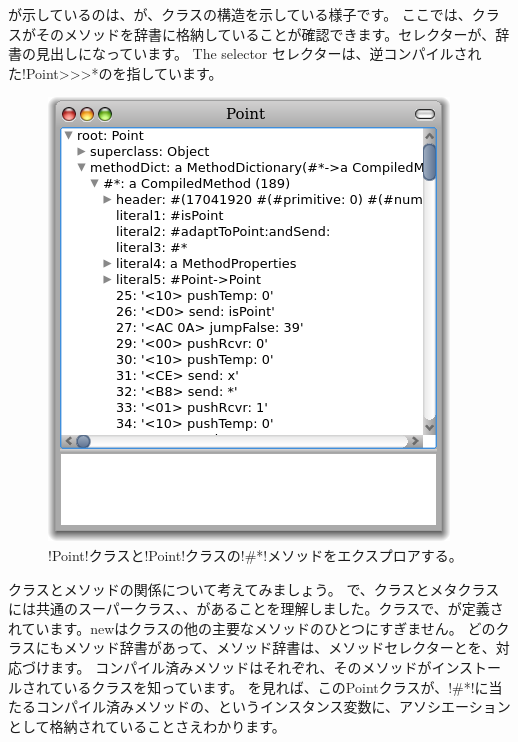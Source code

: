 \documentclass[a4paper,10pt,twoside]{book}
\begin{document}

が示しているのは、が、クラスの構造を示している様子です。
ここでは、クラスがそのメソッドを辞書に格納していることが確認できます。セレクターが、辞書の見出しになっています。
The selector \ct{#*}セレクターは、逆コンパイルされた\ct!Point>>>*のを指しています。

\begin{figure}[ht]\centering
	\includegraphics[width=.5\linewidth]{CompiledMethod}
	\caption{\ct!Point!クラスと\ct!Point!クラスの\ct!\#*!メソッドをエクスプロアする。} %
\end{figure}

クラスとメソッドの関係について考えてみましょう。
で、クラスとメタクラスには共通のスーパークラス、、があることを理解しました。クラスで、が定義されています。newはクラスの他の主要なメソッドのひとつにすぎません。%
どのクラスにもメソッド辞書があって、メソッド辞書は、メソッドセレクターとを、対応づけます。
コンパイル済みメソッドはそれぞれ、そのメソッドがインストールされているクラスを知っています。
を見れば、このPointクラスが、\ct!\#*!に当たるコンパイル済みメソッドの、というインスタンス変数に、アソシエーションとして格納されていることさえわかります。
\end{document}
